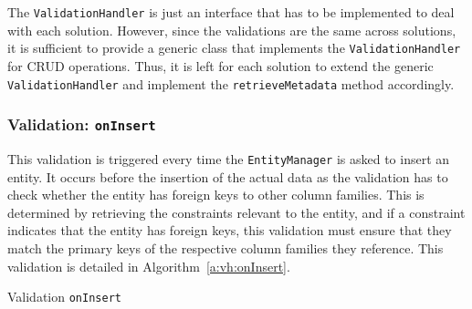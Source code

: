 		
		
		The \texttt{ValidationHandler} is just an interface that has to be implemented
		to deal with each solution. However, since the validations are the same across
		solutions, it is sufficient to provide a generic
		class that implements the \texttt{ValidationHandler} for \ac{CRUD} operations.
		Thus, it is left for each solution to extend the generic
		\texttt{ValidationHandler} and  implement the \texttt{retrieveMetadata}
		method accordingly.
		
		
		
		
	
	\subsubsection{Validation: \texttt{onInsert}}
		This validation is triggered every time the \texttt{EntityManager} is asked to
		insert an entity. It occurs before the insertion of the actual data as the
		validation has to check whether the entity has foreign keys to other column
		families. This is determined by retrieving the  constraints relevant to the
		entity, and if a constraint indicates that the entity has foreign keys,
		this validation must ensure that they match the primary keys of the
		respective column families they reference. This validation is detailed in
		Algorithm~\ref{a:vh:onInsert}.
	
	 	\begin{algorithm}[H]
	 		\caption{Validation \texttt{onInsert}}\label{a:vh:onInsert}
	 		\small
	 	\end{algorithm}
	 	
